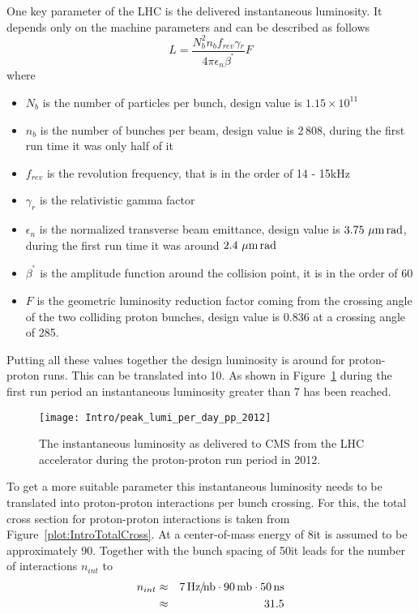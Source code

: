 One key parameter of the LHC is the delivered instantaneous luminosity. It depends only on the machine parameters and can be described as follows
\begin{equation}
L = \frac{N_{b}^{2}n_{b}f_{rev}\gamma{}_{r}}{4\pi\epsilon{}_{n}\beta^{^\ast}}F
\label{eq:Luminosity}
\end{equation}
where
\begin{itemize}
\item{$N_{b}$} is the number of particles per bunch, design value is $1.15 \times 10^{11}$
\item{$n_{b}$} is the number of bunches per beam, design value is 2\,808, during the first run time it was only half of it
\item{$f_{rev}$} is the revolution frequency, that is in the order of 14 - 15\unit{kHz}
\item{$\gamma_{r}$} is the relativistic gamma factor
\item{$\epsilon{}_{n}$} is the normalized transverse beam emittance, design value is $3.75\,\,\mu\text{m}{}\,\text{rad}$, during the first run time it was around $2.4\,\,\mu\text{m}{}\,\text{rad}$
\item{$\beta^{^\ast}$} is the amplitude function around the collision point, it is in the order of 60\cm{}
\item{$F$} is the geometric luminosity reduction factor coming from the crossing angle of the two colliding proton bunches, design value is 0.836 at a crossing angle of 285\murad{}.
\end{itemize}

Putting all these values together the design luminosity is around \LHigh{} for proton-proton runs. This can be translated into 10\hertzpernbarn{}. As shown in Figure~\ref{plot:IntroInstLumi} during the first run period an instantaneous luminosity greater than 7\hertzpernbarn{} has been reached.

\begin{figure}[!Hhtb]
  \centering
  \texttt{[image: Intro/peak\_lumi\_per\_day\_pp\_2012]}
  \caption[Instantaneous luminosity at CMS]{The instantaneous luminosity as delivered to CMS from the LHC accelerator during the proton-proton run period in 2012. \label{plot:IntroInstLumi}}
\end{figure}

To get  a more suitable parameter this instantaneous luminosity needs to be translated into proton-proton interactions per bunch crossing. For this, the total cross section for proton-proton interactions is taken from Figure~\ref{plot:IntroTotalCross}. At a center-of-mass energy of 8\TeV it is assumed to be approximately 90\mb. Together with the bunch spacing of 50\ns it leads for the number of interactions $n_{int}$ to
\begin{eqnarray}
n_{int} & \approx & 7\, \text{Hz\hspace{-0.08em}/\hspace{-0.16em}}\text{nb} \cdot 90\,\text{mb} \cdot 50\,\text{ns} \nonumber \\
 & \approx & 31.5 \nonumber
\end{eqnarray}

